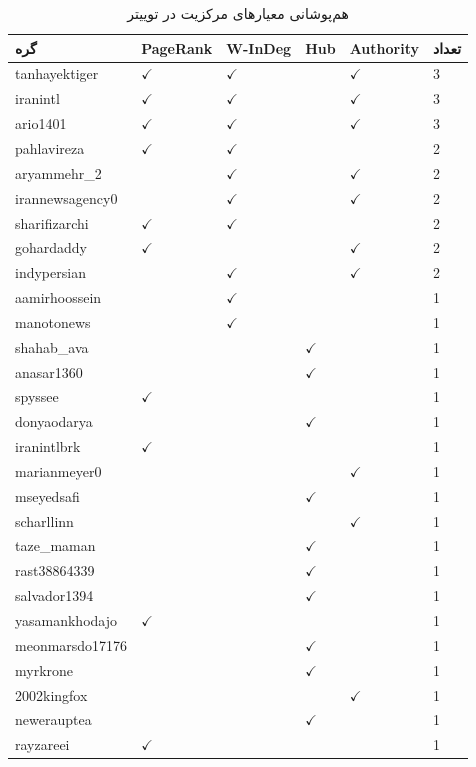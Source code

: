 \documentclass{article}
\begin{document}
	\begin{table}[h!]
		\centering
		\caption{هم‌پوشانی معیارهای مرکزیت در توییتر}
		\label{tab:twitter_overlap}
		\begin{tabular}{@{}llllll@{}}
			\toprule
			\textbf{گره} & \textbf{PageRank} & \textbf{W-InDeg} & \textbf{Hub} & \textbf{Authority} & \textbf{تعداد} \\ \midrule
			tanhayektiger & $\checkmark$ & $\checkmark$ &  & $\checkmark$ & 3 \\
			iranintl & $\checkmark$ & $\checkmark$ &  & $\checkmark$ & 3 \\
			ario1401 & $\checkmark$ & $\checkmark$ &  & $\checkmark$ & 3 \\
			pahlavireza & $\checkmark$ & $\checkmark$ &  &  & 2 \\
			aryammehr\_2 &  & $\checkmark$ &  & $\checkmark$ & 2 \\
			irannewsagency0 &  & $\checkmark$ &  & $\checkmark$ & 2 \\
			sharifizarchi & $\checkmark$ & $\checkmark$ &  &  & 2 \\
			gohardaddy & $\checkmark$ &  &  & $\checkmark$ & 2 \\
			indypersian &  & $\checkmark$ &  & $\checkmark$ & 2 \\
			aamirhoossein &  & $\checkmark$ &  &  & 1 \\
			manotonews &  & $\checkmark$ &  &  & 1 \\
			shahab\_ava &  &  & $\checkmark$ &  & 1 \\
			anasar1360 &  &  & $\checkmark$ &  & 1 \\
			spyssee & $\checkmark$ &  &  &  & 1 \\
			donyaodarya &  &  & $\checkmark$ &  & 1 \\
			iranintlbrk & $\checkmark$ &  &  &  & 1 \\
			marianmeyer0 &  &  &  & $\checkmark$ & 1 \\
			mseyedsafi &  &  & $\checkmark$ &  & 1 \\
			scharllinn &  &  &  & $\checkmark$ & 1 \\
			taze\_maman &  &  & $\checkmark$ &  & 1 \\
			rast38864339 &  &  & $\checkmark$ &  & 1 \\
			salvador1394 &  &  & $\checkmark$ &  & 1 \\
			yasamankhodajo & $\checkmark$ &  &  &  & 1 \\
			meonmarsdo17176 &  &  & $\checkmark$ &  & 1 \\
			myrkrone &  &  & $\checkmark$ &  & 1 \\
			2002kingfox &  &  &  & $\checkmark$ & 1 \\
			newerauptea &  &  & $\checkmark$ &  & 1 \\
			rayzareei & $\checkmark$ &  &  &  & 1 \\ \bottomrule
		\end{tabular}
	\end{table}
	
\end{document}
